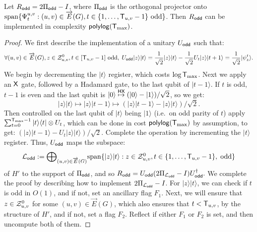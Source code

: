\documentclass{theoretics}
\def\ket#1{{\lvert}#1\rangle}
\def\bra#1{{\langle}#1\rvert}
\renewcommand{\>}{\rangle}
\newcommand{\<}{\langle}
\renewcommand{\(}{\left(}
\renewcommand{\)}{\right)}
\begin{document}
\begin{claim}\label{clm:fwk-odd-unitary}
Let $R_{\sf odd} =2\Pi_{\sf odd}-I$, where $\Pi_{\sf odd}$ is the orthogonal projector onto $\mathrm{span}\{\Psi_t^{u,v}:(u,v)\in\overrightarrow{E}(G), t\in\{1,\dots,{\sf T}_{u,v}-1\}\mbox{ odd}\}$. Then $R_{\sf odd}$ can be implemented in complexity ${\sf polylog}({\sf T}_{\max})$. 
\end{claim}
\begin{proof}
We first describe the implementation of a unitary $U_{\sf odd}$ such that:
\begin{equation*}
\forall (u,v)\in\overrightarrow{E}(G),z\in{\cal Z}_{u,v}^0, t\in[{\sf T}_{u,v}-1] \text{ odd}, \; U_{\sf odd}\ket{z}\ket{t} = \frac{1}{\sqrt{2}}\ket{z}\ket{t} - \frac{1}{\sqrt{2}}U_t\ket{z}\ket{t+1}    
= \frac{1}{\sqrt{2}}\ket{\psi_{z}^{t}}.\label{eq:U-S-0}
\end{equation*}
We begin by decrementing the $\ket{t}$ register, which costs $\log {\sf T}_{\max}$.
Next we apply an ${\sf X}$ gate, followed by a Hadamard gate, to the last qubit of $\ket{t-1}$. If $t$ is odd, $t-1$ is even and the last qubit is $\ket{0}\overset{{\sf HX}}{\mapsto} (\ket{0}-\ket{1})/\sqrt{2}$, so we get: 
$$\ket{z}\ket{t}\mapsto \ket{z}\ket{t-1}\mapsto \left(\ket{z}\ket{t-1}-\ket{z}\ket{t}\right)/\sqrt{2}.$$
Then controlled on the last qubit of $\ket{t}$ being $\ket{1}$ (i.e.~on odd parity of $t$) apply $\sum_{t=0}^{{\sf T}_{\max}-1}\ket{t}\bra{t}\otimes U_t$, which can be done in cost ${\sf polylog}({\sf T}_{\max})$ by assumption, to get:
$
\left(\ket{z}\ket{t-1}-U_t\ket{z}\ket{t}\right)/\sqrt{2}.
$
Complete the operation by incrementing the $\ket{t}$ register. Thus, $U_{\sf odd}$ maps the subspace:
$${\cal L}_{\sf odd}:=\textstyle{\displaystyle\bigoplus}_{(u,v)\in\overrightarrow{E}(G)}\mathrm{span}\{\ket{z}\ket{t}:z\in {\cal Z}_{u,v}^0,t\in\{1,\dots,{\sf T}_{u,v}-1\},\;\mbox{odd}\}$$
of $H'$ to the support of $\Pi_{\sf odd}$, and so
$R_{\sf odd}=U_{\sf odd}(2\Pi_{{\cal L}_{\sf odd}}-I)U_{\sf odd}^\dagger.$
We complete the proof by describing how to implement $2\Pi_{{\cal L}_{\sf odd}}-I$. For $\ket{z}\ket{t}$, we can check if $t$ is odd in $O(1)$, and if not, set an ancillary flag $F_1$. Next, we will ensure that $z\in {\cal Z}_{u,v}^0$ for some $(u,v)\in\overrightarrow{E}(G)$, which also ensures that $t<{\sf T}_{u,v}$, by the structure of $H'$, and if not, set a flag $F_2$. Reflect if either $F_1$ or $F_2$ is set, and then uncompute both of them. 
\end{proof}
                                                                     
\end{document}

